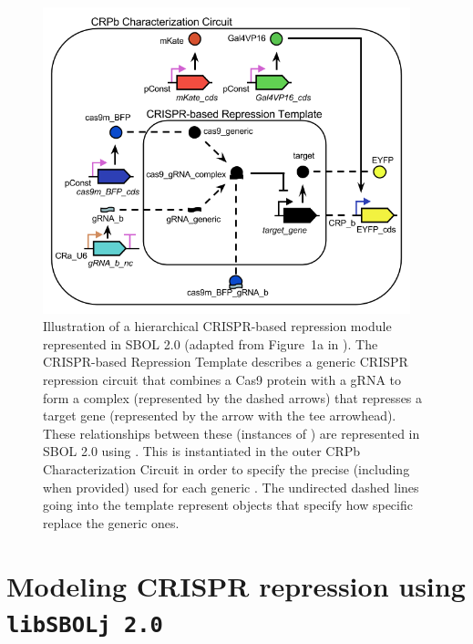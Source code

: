 \begin{figure}[tbph]
\begin{center}
  \includegraphics[width=0.95\textwidth]{figures/crispr_repression2} 
\end{center}
\caption{\label{fig:fig-CRPb} Illustration of a hierarchical CRISPR-based repression module represented in SBOL 2.0 (adapted from Figure~1a in \cite{kiani2014crispr}). The CRISPR-based Repression Template  describes a generic CRISPR repression circuit that combines a Cas9 protein with a gRNA to form a complex (represented by the dashed arrows) that represses a target gene (represented by the arrow with the tee arrowhead).  These relationships between these  (instances of ) are represented in SBOL 2.0 using .  This  is instantiated in the outer CRPb Characterization Circuit  in order to specify the precise (including  when provided)   used for each generic . The undirected dashed lines going into the template  represent  objects that specify how specific  replace the generic ones.}
\end{figure}

\section*{Modeling CRISPR repression using {\tt libSBOLj 2.0}}

